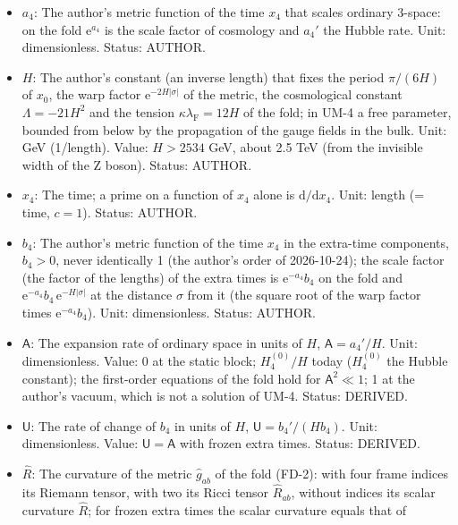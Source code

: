 \documentclass[
  10pt,
]{article}
\providecommand{\tightlist}{%
  \setlength{\itemsep}{0pt}\setlength{\parskip}{0pt}}
\begin{document}
\begin{itemize}
\tightlist
\item
  \(a_4\): The author's metric function of the time \(x_4\) that scales
  ordinary 3-space: on the fold \(\mathrm{e}^{a_4}\) is the scale factor
  of cosmology and \(a_4'\) the Hubble rate. Unit: dimensionless.
  Status: AUTHOR.
\item
  \(H\): The author's constant (an inverse length) that fixes the period
  \(\pi/(6H)\) of \(x_0\), the warp factor
  \(\mathrm{e}^{-2H\lvert\sigma\rvert}\) of the metric, the cosmological
  constant \(\Lambda = -21H^2\) and the tension
  \(\kappa\lambda_{\mathrm{F}} = 12H\) of the fold; in UM-4 a free
  parameter, bounded from below by the propagation of the gauge fields
  in the bulk. Unit: GeV (1/length). Value: \(H > 2534\) GeV, about 2.5
  TeV (from the invisible width of the Z boson). Status: AUTHOR.
\item
  \(x_4\): The time; a prime on a function of \(x_4\) alone is
  \(\mathrm{d}/\mathrm{d}x_4\). Unit: length (= time, \(c = 1\)).
  Status: AUTHOR.
\item
  \(b_4\): The author's metric function of the time \(x_4\) in the
  extra-time components, \(b_4 > 0\), never identically 1 (the author's
  order of 2026-10-24); the scale factor (the factor of the lengths) of
  the extra times is \(\mathrm{e}^{-a_4}b_4\) on the fold and
  \(\mathrm{e}^{-a_4}b_4\,\mathrm{e}^{-H\lvert\sigma\rvert}\) at the
  distance \(\sigma\) from it (the square root of the warp factor times
  \(\mathrm{e}^{-a_4}b_4\)). Unit: dimensionless. Status: AUTHOR.
\item
  \(\mathsf{A}\): The expansion rate of ordinary space in units of
  \(H\), \(\mathsf{A} = a_4'/H\). Unit: dimensionless. Value: 0 at the
  static block; \(H_4^{(0)}/H\) today (\(H_4^{(0)}\) the Hubble
  constant); the first-order equations of the fold hold for
  \(\mathsf{A}^2 \ll 1\); 1 at the author's vacuum, which is not a
  solution of UM-4. Status: DERIVED.
\item
  \(\mathsf{U}\): The rate of change of \(b_4\) in units of \(H\),
  \(\mathsf{U} = b_4'/(Hb_4)\). Unit: dimensionless. Value:
  \(\mathsf{U} = \mathsf{A}\) with frozen extra times. Status: DERIVED.
\item
  \(\hat R\): The curvature of the metric \(\hat g_{ab}\) of the fold
  (FD-2): with four frame indices its Riemann tensor, with two its Ricci
  tensor \(\hat R_{ab}\), without indices its scalar curvature
  \(\hat R\); for frozen extra times the scalar curvature equals that of

\end{itemize}
\end{document}
